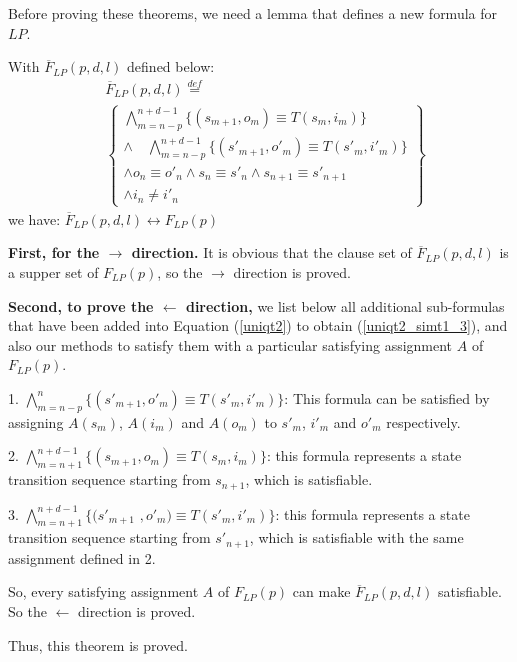 \documentclass[journal]{IEEEtran}
\begin{document}
Before proving these theorems,
we need a lemma that defines a new formula for $LP$.

\begin{lemma}\label{t2t2new}
With $\overline{F}_{LP}(p,d,l)$ defined below:
\begin{equation}\label{uniqt2_simt1_3}
\begin{split}
&\overline{F}_{LP}(p,d,l)\overset{def}{=}\\
&\left\{
\begin{array}{c}
\bigwedge_{m=n-p}^{n+d-1}
\{
(s_{m+1},o_m)\equiv T(s_m,i_m)
\}
\\
\wedge\quad\bigwedge_{m=n-p}^{n+d-1}
\{
(s'_{m+1},o'_m)\equiv T(s'_m,i'_m)
\}
\\
\wedge o_n\equiv o'_n\wedge s_n\equiv s'_n\wedge s_{n+1}\equiv s'_{n+1} \\
\wedge i_n\ne i'_n
\end{array}
\right\}
\end{split}
\end{equation}
we have:
$\overline{F}_{LP}(p,d,l)\leftrightarrow F_{LP}(p)$
\end{lemma}
\begin{IEEEproof}
\textbf{First,
for the $\to$ direction.}
It is obvious that the clause set of $\overline{F}_{LP}(p,d,l)$ is a supper set of $F_{LP}(p)$,
so the $\to$ direction is proved.

\textbf{Second,
to prove the $\gets$ direction,}
we list below all additional sub-formulas that have been added into Equation (\ref{uniqt2}) to obtain (\ref{uniqt2_simt1_3}),
and also our methods to satisfy them with a particular satisfying assignment $A$ of $F_{LP}(p)$.

1. $\bigwedge_{m=n-p}^{n}\{(s'_{m+1},o'_m)\equiv T(s'_m,i'_m)\}$: This formula can be satisfied by assigning $A(s_m)$, $A(i_m)$ and $A(o_m)$ to $s'_m$, $i'_m$ and $o'_m$ respectively.

2. $\bigwedge_{m=n+1}^{n+d-1}\{(s_{m+1},o_m)\equiv T(s_m,i_m)\}$:
this formula represents a state transition sequence starting from $s_{n+1}$,
which is satisfiable.

3. $\bigwedge_{m=n+1}^{n+d-1}\{(s'_{m+1}$ $,o'_m)\equiv T(s'_m,i'_m)\}$:
this formula represents a state transition sequence starting from $s'_{n+1}$,
which is satisfiable with the same assignment defined in 2.

So,
every satisfying assignment $A$ of $F_{LP}(p)$ can make $\overline{F}_{LP}(p,d,l)$ satisfiable.
So the $\gets$ direction is proved.

Thus, this theorem is proved.
\end{IEEEproof}
\end{document}
